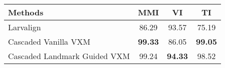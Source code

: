 \begin{adjustbox}{width=0.6\linewidth}
\begin{tabular}{lccc}
\hline
 ﻿Methods  & MMI   & VI    & TI    \\ \hline \hline
 Larvalign & 86.29 & 93.57 & 75.19 \\
 Cascaded Vanilla VXM  & \textbf{99.33} & 86.05 & \textbf{99.05} \\
 Cascaded Landmark Guided VXM  & 99.24 & \textbf{94.33} & 98.52 \\
\hline
\end{tabular}
\end{adjustbox}